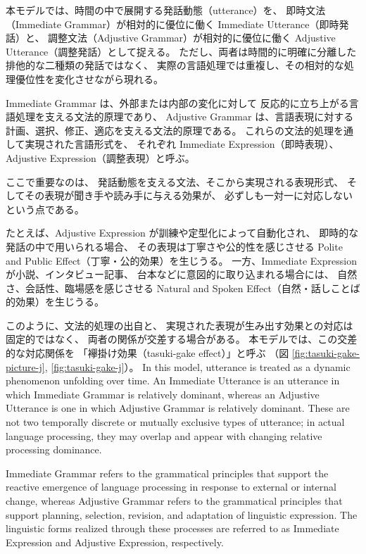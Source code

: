 \documentclass[a4paper]{article}
\begin{document}
\ifJPN
本モデルでは、時間の中で展開する発話動態（utterance）を、
即時文法（Immediate Grammar）が相対的に優位に働く
Immediate Utterance（即時発話）と、
調整文法（Adjustive Grammar）が相対的に優位に働く
Adjustive Utterance（調整発話）として捉える。
ただし、両者は時間的に明確に分離した排他的な二種類の発話ではなく、
実際の言語処理では重複し、その相対的な処理優位性を変化させながら現れる。

Immediate Grammar は、外部または内部の変化に対して
反応的に立ち上がる言語処理を支える文法的原理であり、
Adjustive Grammar は、言語表現に対する計画、選択、修正、適応を支える文法的原理である。
これらの文法的処理を通して実現された言語形式を、
それぞれ Immediate Expression（即時表現）、
Adjustive Expression（調整表現）と呼ぶ。

ここで重要なのは、
発話動態を支える文法、そこから実現される表現形式、
そしてその表現が聞き手や読み手に与える効果が、
必ずしも一対一に対応しないという点である。

たとえば、Adjustive Expression が訓練や定型化によって自動化され、
即時的な発話の中で用いられる場合、
その表現は丁寧さや公的性を感じさせる
Polite and Public Effect（丁寧・公的効果）を生じうる。
一方、Immediate Expression が小説、インタビュー記事、
台本などに意図的に取り込まれる場合には、
自然さ、会話性、臨場感を感じさせる
Natural and Spoken Effect（自然・話しことば的効果）を生じうる。

このように、文法的処理の出自と、
実現された表現が生み出す効果との対応は固定的ではなく、
両者の関係が交差する場合がある。
本モデルでは、この交差的な対応関係を
「襷掛け効果（tasuki-gake effect）」と呼ぶ
（図 \ref{fig:tasuki-gake-picture-j}, \ref{fig:tasuki-gake-j}）。
\else
In this model, utterance is treated as a dynamic phenomenon unfolding over time.
An Immediate Utterance is an utterance in which
Immediate Grammar is relatively dominant,
whereas an Adjustive Utterance is one in which
Adjustive Grammar is relatively dominant.
These are not two temporally discrete or mutually exclusive types of utterance;
in actual language processing, they may overlap and appear with changing relative processing dominance.

Immediate Grammar refers to the grammatical principles that support
the reactive emergence of language processing in response to external or internal change,
whereas Adjustive Grammar refers to the grammatical principles that support
planning, selection, revision, and adaptation of linguistic expression.
The linguistic forms realized through these processes are referred to as
Immediate Expression and Adjustive Expression, respectively.
\end{document}
